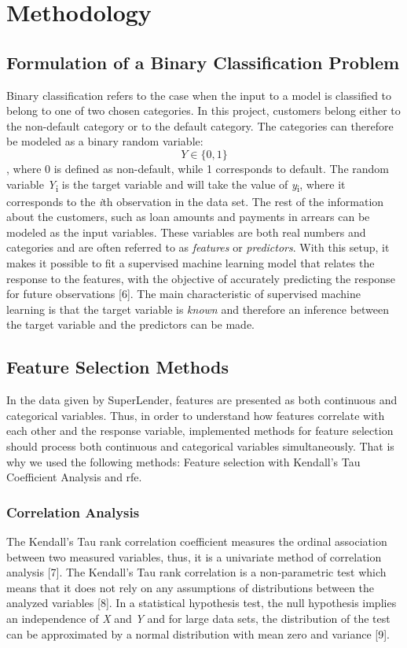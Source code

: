 \documentclass[a4paper]{article}
\begin{document}
\section{Methodology}
\subsection{Formulation of a Binary Classification Problem}

Binary classification refers to the case when the input to a model is classified to belong to one of two chosen categories. In this project, customers belong either to the non-default category or to the default category. The categories can therefore be modeled as a binary random variable: \[\textit{Y}\in \{ 0, 1\}\], where 0 is defined as non-default, while 1 corresponds to default. The random variable \textit{Y}\textsubscript{i} is the target variable and will take the value of \textit{y}\textsubscript{i}, where it corresponds to the \textit{i}th observation in the data set. The rest of the information about the customers, such as loan amounts and payments in arrears can be modeled as the input variables. These variables are both real numbers and categories and are often referred to as \textit{features} or \textit{predictors}. With this setup, it makes it possible to fit a supervised machine learning model that relates the response to the features, with the objective of accurately predicting the response for future observations [6]. The main characteristic of supervised machine learning is that the target variable is \textit{known} and therefore an inference between the target variable and the predictors can be made. 

\subsection{Feature Selection Methods}
In the data given by SuperLender, features are presented as both continuous and categorical variables. Thus, in order to understand how features correlate with each other and the response variable, implemented methods for feature selection should process both continuous and categorical variables simultaneously. That is why we used the following methods: Feature selection with Kendall’s Tau Coefficient Analysis and \gls{rfe}.

\subsubsection{Correlation Analysis}
The Kendall’s Tau rank correlation coefficient measures the ordinal association between two measured variables, thus, it is a univariate method of correlation analysis [7]. The Kendall’s Tau rank correlation is a non-parametric test which means that it does not rely on any assumptions of distributions between the analyzed variables [8]. In a statistical hypothesis test, the null hypothesis implies an independence of \textit{X} and \textit{Y} and for large data sets, the distribution of the test can be approximated by a normal distribution with mean zero and variance [9].
\end{document}
